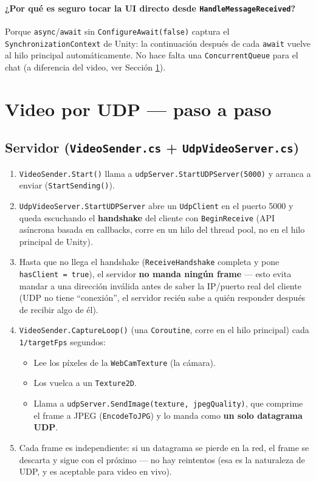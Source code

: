 \documentclass[11pt,a4paper]{article}
\begin{document}
\paragraph{¿Por qué es seguro tocar la UI directo desde \texttt{HandleMessageReceived}?}
Porque \texttt{async}/\texttt{await} sin \texttt{ConfigureAwait(false)} captura el
\texttt{SynchronizationContext} de Unity: la continuación después de cada \texttt{await}
vuelve al hilo principal automáticamente. No hace falta una \texttt{ConcurrentQueue}
para el chat (a diferencia del video, ver Sección \ref{sec:video}).

\section{Video por UDP — paso a paso}
\label{sec:video}

\subsection{Servidor (\texttt{VideoSender.cs} + \texttt{UdpVideoServer.cs})}
\begin{enumerate}
  \item \texttt{VideoSender.Start()} llama a \texttt{udpServer.StartUDPServer(5000)} y arranca a enviar (\texttt{StartSending()}).
  \item \texttt{UdpVideoServer.StartUDPServer} abre un \texttt{UdpClient} en el puerto 5000 y queda escuchando el \textbf{handshake} del cliente con \texttt{BeginReceive} (API asíncrona basada en callbacks, corre en un hilo del thread pool, no en el hilo principal de Unity).
  \item Hasta que no llega el handshake (\texttt{ReceiveHandshake} completa y pone \texttt{hasClient = true}), el servidor \textbf{no manda ningún frame} — esto evita mandar a una dirección inválida antes de saber la IP/puerto real del cliente (UDP no tiene ``conexión'', el servidor recién sabe a quién responder después de recibir algo de él).
  \item \texttt{VideoSender.CaptureLoop()} (una \texttt{Coroutine}, corre en el hilo principal) cada \texttt{1/targetFps} segundos:
  \begin{itemize}
    \item Lee los píxeles de la \texttt{WebCamTexture} (la cámara).
    \item Los vuelca a un \texttt{Texture2D}.
    \item Llama a \texttt{udpServer.SendImage(texture, jpegQuality)}, que comprime el frame a JPEG (\texttt{EncodeToJPG}) y lo manda como \textbf{un solo datagrama UDP}.
  \end{itemize}
  \item Cada frame es independiente: si un datagrama se pierde en la red, el frame se descarta y sigue con el próximo — no hay reintentos (esa es la naturaleza de UDP, y es aceptable para video en vivo).
\end{enumerate}
\end{document}
